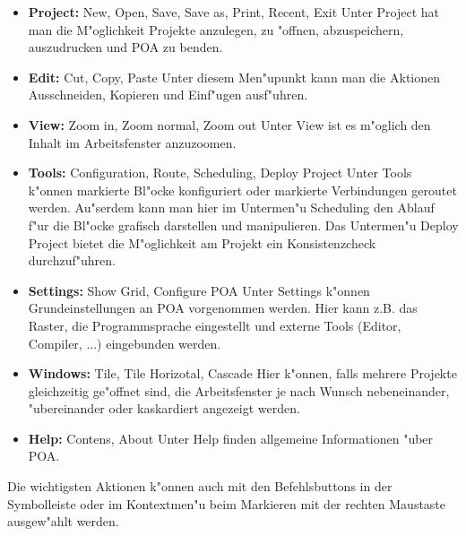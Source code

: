 \documentclass[a4paper,titlepage,12pt,ngerman]{scrbook}
\begin{document}
\begin{itemize}
\item {\bf Project:}	New, Open, Save, Save as, Print, Recent, Exit\newline
Unter Project hat man die M"oglichkeit Projekte anzulegen, zu "offnen, abzuspeichern, auszudrucken und POA zu benden.
\item {\bf Edit:}	Cut, Copy, Paste\newline
Unter diesem Men"upunkt kann man die Aktionen Ausschneiden, Kopieren und Einf"ugen ausf"uhren.
\item {\bf View:}	Zoom in, Zoom normal, Zoom out\newline
Unter View ist es m"oglich den Inhalt im Arbeitsfenster anzuzoomen.
\item {\bf Tools:} 	Configuration, Route, Scheduling, Deploy Project\newline
Unter Tools k"onnen markierte Bl"ocke konfiguriert oder markierte Verbindungen geroutet werden. Au"serdem kann man hier im Untermen"u Scheduling den Ablauf f"ur die Bl"ocke grafisch darstellen und manipulieren. Das Untermen"u Deploy Project bietet die M"oglichkeit am Projekt ein Konsistenzcheck durchzuf"uhren.
\item {\bf Settings:}	Show Grid, Configure POA\newline
Unter Settings k"onnen Grundeinstellungen an POA vorgenommen werden. Hier kann z.B. das Raster, die Programmsprache eingestellt und externe Tools (Editor, Compiler, ...) eingebunden werden.
\item {\bf Windows:} 	Tile, Tile Horizotal, Cascade\newline
Hier k"onnen, falls mehrere Projekte gleichzeitig ge"offnet sind, die Arbeitsfenster je nach Wunsch nebeneinander, "ubereinander oder kaskardiert angezeigt werden.
\item {\bf Help:} 	Contens, About\newline
Unter Help finden allgemeine Informationen "uber POA.\par
\end{itemize}

Die wichtigsten Aktionen k"onnen auch mit den Befehlsbuttons in der Symbolleiste oder im Kontextmen"u beim Markieren mit der rechten Maustaste ausgew"ahlt werden.
\end{document}
